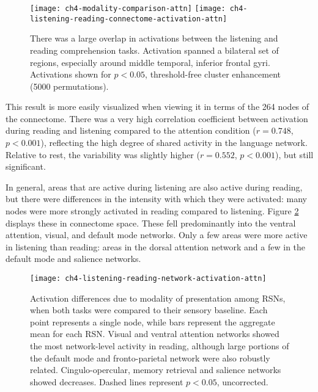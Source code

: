 \begin{figure}[t!]
	\centering
	\texttt{[image: ch4-modality-comparison-attn]}
	\texttt{[image: ch4-listening-reading-connectome-activation-attn]}
    \caption[Large overlap between listening and reading activation]{There was a large overlap in activations between the listening and reading comprehension tasks. Activation spanned a bilateral set of regions, especially around middle temporal, inferior frontal gyri. Activations shown for $p < 0.05$, threshold-free cluster enhancement (5000 permutations).}
	\label{fig:ch4-modality-comparison-attn}
\end{figure}

This result is more easily visualized when viewing it in terms of the 264 nodes of the connectome. There was a very high correlation coefficient between activation during reading and listening compared to the attention condition ($r = 0.748$, $p < 0.001$), reflecting the high degree of shared activity in the language network. Relative to rest, the variability was slightly higher ($r = 0.552$, $p < 0.001$), but still significant. 

In general, areas that are active during listening are also active during reading, but there were differences in the intensity with which they were activated: many nodes were more strongly activated in reading compared to listening. Figure \ref{fig:ch4-listening-reading-network-activation-attn} displays these in connectome space. These fell predominantly into the ventral attention, visual, and default mode networks. Only a few areas were more active in listening than reading: areas in the dorsal attention network and a few in the default mode and salience networks. 

\begin{figure}[t]
	\centering
	\texttt{[image: ch4-listening-reading-network-activation-attn]}
    \caption[Activation differences due to modality of presentation among RSNs]{Activation differences due to modality of presentation among RSNs, when both tasks were compared to their sensory baseline. Each point represents a single node, while bars represent the aggregate mean for each RSN. Visual and ventral attention networks showed the most network-level activity in reading, although large portions of the default mode and fronto-parietal network were also robustly related. Cingulo-opercular, memory retrieval and salience networks showed decreases. Dashed lines represent $p < 0.05$, uncorrected.}
	\label{fig:ch4-listening-reading-network-activation-attn}
\end{figure}

